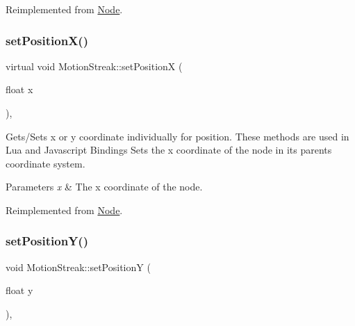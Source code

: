 Reimplemented from \hyperlink{classNode_ae1dfc73d6122a95778d5d9db3d1fd913}{Node}.

\mbox{\label{classMotionStreak_af6cb7fe8388e16af000893b75c9676a0}} 
\subsubsection{\texorpdfstring{set\+Position\+X()}{setPositionX()}\hspace{0.1cm}{\footnotesize\ttfamily [2/2]}}
{\footnotesize\ttfamily virtual void Motion\+Streak\+::set\+PositionX (\begin{DoxyParamCaption}\item[{float}]{x }\end{DoxyParamCaption})\hspace{0.3cm}{\ttfamily [override]}, {\ttfamily [virtual]}}

Gets/\+Sets x or y coordinate individually for position. These methods are used in Lua and Javascript Bindings Sets the x coordinate of the node in its parent\textquotesingle{}s coordinate system.


\begin{DoxyParams}{Parameters}
{\em x} & The x coordinate of the node. \\
\hline
\end{DoxyParams}


Reimplemented from \hyperlink{classNode_ae1dfc73d6122a95778d5d9db3d1fd913}{Node}.

\mbox{\label{classMotionStreak_a78b4896032c6ef6e21ce5d9012d82d13}} 
\subsubsection{\texorpdfstring{set\+Position\+Y()}{setPositionY()}\hspace{0.1cm}{\footnotesize\ttfamily [1/2]}}
{\footnotesize\ttfamily void Motion\+Streak\+::set\+PositionY (\begin{DoxyParamCaption}\item[{float}]{y }\end{DoxyParamCaption})\hspace{0.3cm}{\ttfamily [override]}, {\ttfamily [virtual]}}


